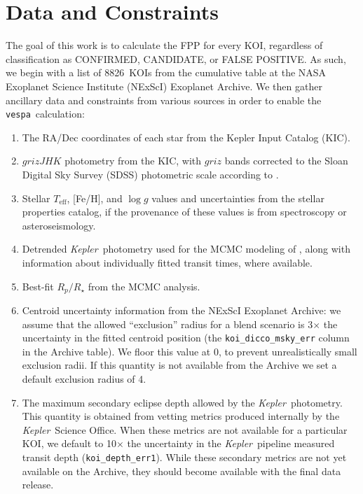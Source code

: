 \documentclass{emulateapj}
\newcommand{\sectlabel}[1]{\label{sect:#1}}
\newcommand{\ntotal}{8826}
\newcommand{\kepler}{\textit{Kepler}}
\newcommand{\vespa}{\texttt{vespa}}
\begin{document}

\section{Data and Constraints}
\sectlabel{data}

The goal of this work is to calculate the FPP for every KOI,
regardless of classification as CONFIRMED, CANDIDATE, or FALSE
POSITIVE.  As such, we begin with a list of \ntotal\ KOIs from the
cumulative table at the NASA Exoplanet Science Institute (NExScI)
Exoplanet Archive.  We then gather ancillary data and constraints from
various sources in order to enable the \vespa\ calculation:

\begin{enumerate}
\item The RA/Dec coordinates of each star from the Kepler Input
  Catalog (KIC).
\item $grizJHK$ photometry from the KIC, with $griz$ bands corrected
  to the Sloan Digital Sky Survey (SDSS) photometric scale according
  to \citet{Pinsonneault:2012}.
\item Stellar $T_\mathrm{eff}$, [Fe/H], and $\log g$ values and
  uncertainties from the \citet{Huber:2014} stellar properties
  catalog, if the provenance of these values is from spectroscopy or
  asteroseismology.
\item Detrended \kepler\ photometry used for the MCMC modeling of
  \citet{Rowe:2015}, along with information about individually fitted
  transit times, where available.  
\item Best-fit $R_p/R_\star$ from the \citet{Rowe:2015} MCMC analysis.
\item Centroid uncertainty information from the NExScI Exoplanet
  Archive: we assume that the allowed ``exclusion'' radius for a blend
  scenario is 3$\times$ the uncertainty in the fitted centroid
  position (the \verb|koi_dicco_msky_err| column in the Archive
  table).  We floor this value at 0, to prevent unrealistically
  small exclusion radii.  If this quantity is not available from the
  Archive we set a default exclusion radius of 4\arcsec.
\item The maximum secondary eclipse depth allowed by the
  \kepler\ photometry.  This quantity is obtained from vetting
  metrics produced internally by the \kepler\ Science Office.  When
  these metrics are not available for a particular KOI, we
  default to 10$\times$ the uncertainty in the \kepler\ pipeline
  measured transit depth (\verb|koi_depth_err1|).  While these
  secondary metrics are not yet available on the Archive, they should
  become available with the final data release.  
  
\end{enumerate}
\end{document}
